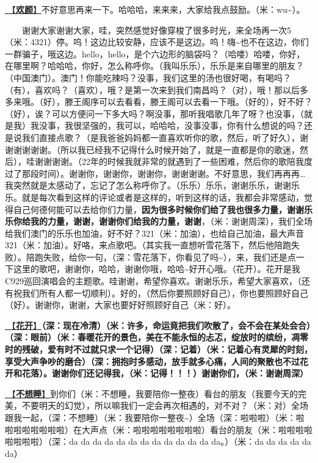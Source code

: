 \documentclass[]{ctexbook}
\begin{document}
\hyperref[happy-face]{🎵【\textbf{欢颜}】}不好意思再来一下。哈哈哈，来来来，大家给我点鼓励。（米：wu\textasciitilde）。

  谢谢大家谢谢大家，哇，突然感觉好像穿梭了很多时光，来全场再一次5（米：4321）停。呜！这边比较安静，应该不是这边。呜！嗨\textasciitilde 也不在这边，你们一群骗子，哦这边。hello，hello，是个六边形的脑袋吗？（哈喽）哈喽，你好，在哪里啊？哈哈哈，你好，怎么称呼你。（我叫乐乐），乐乐是来自哪里的朋友？（中国澳门）。澳门！你能吃辣吗？没事，我们这里的汤也很好喝，有喝吗？（有），喜欢吗？（喜欢），哦？是第一次来到我们南昌吗？（对），哦！那以后多多来哦。（好），滕王阁序可以去看看，滕王阁可以去看一下哦。（好的），好不好？（好），诶？可以方便问一下多大吗？啊没事，那听我唱歌几年了呀？也没事，（就是我）我没事，我很坚强的，我可以，哈哈哈，没事没事，你有什么想说的吗？还是说我们直接点歌？（是我爸爸妈妈都一直喜欢听你的歌，然后，听了好久），谢谢谢谢谢谢。（所以我已经我不记得什么时候开始了，就是一直都是你的歌迷，然后），哇谢谢谢谢。（22年的时候我就非常的就遇到了一些困难，然后你的歌陪我度过了那段时间）。谢谢你，谢谢你，谢谢你，谢谢谢谢。不好意思，我们再再再\ldots 我突然就是太感动了，忘记了怎么称呼你了。（乐乐）乐乐，谢谢乐乐，谢谢乐乐。就是每次看到这样的评论或者是这样的，听到这样的话，我都会非常感动，觉得自己何德何能可以去给你们力量，\textbf{因为很多时候你们给了我也很多力量，谢谢乐乐你给我的力量，谢谢，谢谢你们给我的力量，谢谢}，（米：谢谢周深），我们全场给我们澳门的乐乐也加油，好不好？321（米：加油），也给自己加油，最大声音321（米：加油）。好咯，来点歌吧。（其实我一直想听雪花落下，然后他陪跑失败）。陪跑失败，给你一句，（深：雪花落下，你看见了吗\textasciitilde），来，我们还是点一下这里的歌吧，谢谢你，哈哈，谢谢你哦，哈哈\textasciitilde 好开心哦。（花开）。花开是我C929巡回演唱会的主题歌。哇谢谢，希望你喜欢。谢谢乐乐，希望大家喜欢，（还有祝我们所有人都一切顺利）。好的，（然后你要照顾好自己），你也要照顾好自己（好）。谢谢你，谢谢，大家也要好好照顾好自己（米：好）。

\hyperref[bloom]{🎵【\textbf{花开}】}\textbf{（深：现在冷清）（米：许多，命运竟把我们吹散了，会不会在某处会合）（深：眼前）（米：春暖花开的景色，美在不能永恒的忐忑，绽放时的缤纷，凋零时的残破，爱有时不过就只求一个记得）（深：记着）（米：记着心有灵犀的时刻，享受大声争吵的磨合）（深：拥抱时多感动，放手就多心痛，人间的聚散也不过花开和花落）。谢谢你们还记得我，（米：记得！！！）谢谢你们，（米：谢谢周深）}

\hyperref[keep-playing]{🎵【\textbf{不想睡}】}到你们（米：不想睡，我要陪你一整夜）看台的朋友（我要今天的完美，不要明天的幻觉），所以嘛我们一定会再次相遇的，对不对？（米：对）全场跟我一起，（深：不想睡）（米：我要陪你一整夜\textasciitilde）全场（深：啦啦啦）（米：啦啦啦啦啦啦啦啦）在大声点（米：啦啦啦啦啦啦啦啦）看台的朋友（米：啦啦啦啦啦啦啦啦）（深：da da da da da da da da da da da da da。）（米：da da da da da da）
\end{document}
